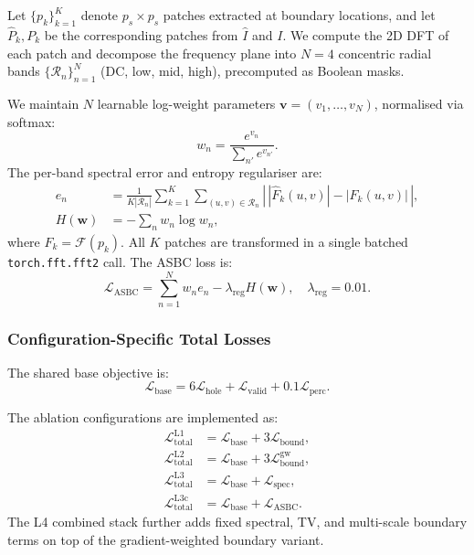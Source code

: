 \documentclass[10pt,conference]{IEEEtran}
\newcommand{\Lhole}{\mathcal{L}_{\mathrm{hole}}}
\newcommand{\Lvalid}{\mathcal{L}_{\mathrm{valid}}}
\newcommand{\Lbound}{\mathcal{L}_{\mathrm{bound}}}
\newcommand{\Lperc}{\mathcal{L}_{\mathrm{perc}}}
\newcommand{\Lspec}{\mathcal{L}_{\mathrm{spec}}}
\newcommand{\LASBC}{\mathcal{L}_{\mathrm{ASBC}}}
\newcommand{\Ltotal}{\mathcal{L}_{\mathrm{total}}}
\newcommand{\Lbase}{\mathcal{L}_{\mathrm{base}}}
\begin{document}
Let $\{p_k\}_{k=1}^{K}$ denote $p_s \times p_s$ patches extracted at
boundary locations, and let $\hat{P}_k, P_k$ be the corresponding patches
from $\hat{I}$ and $I$.  We compute the 2D DFT of each patch and decompose
the frequency plane into $N=4$ concentric radial bands
$\{\mathcal{R}_n\}_{n=1}^{N}$ (DC, low, mid, high), precomputed as
Boolean masks.

We maintain $N$ learnable log-weight parameters
$\mathbf{v} = (v_1,\ldots,v_N)$, normalised via softmax:
\begin{equation}
  w_n = \frac{e^{v_n}}{\sum_{n'} e^{v_{n'}}}.
  \label{eq:softmax_w}
\end{equation}
The per-band spectral error and entropy regulariser are:
\begin{align}
  e_n &= \frac{1}{K|\mathcal{R}_n|}\sum_{k=1}^{K}\sum_{(u,v)\in\mathcal{R}_n}
         \!\!\left|\,|\hat{F}_k(u,v)| - |F_k(u,v)|\,\right|,
  \label{eq:band_error}\\
  H(\mathbf{w}) &= -\sum_n w_n \log w_n,
  \label{eq:entropy}
\end{align}
where $F_k = \mathcal{F}(p_k)$.  All $K$ patches are transformed in a single
batched \texttt{torch.fft.fft2} call.  The ASBC loss is:
\begin{equation}
  \LASBC = \sum_{n=1}^{N} w_n e_n - \lambda_{\mathrm{reg}} H(\mathbf{w}),
  \quad \lambda_{\mathrm{reg}}=0.01.
  \label{eq:asbc}
\end{equation}

\subsubsection{Configuration-Specific Total Losses}
The shared base objective is:
\begin{equation}
  \Lbase = 6\Lhole + \Lvalid + 0.1\Lperc.
  \label{eq:lbase}
\end{equation}

The ablation configurations are implemented as:
\begin{align}
  \Ltotal^{\mathrm{L1}}  &= \Lbase + 3\Lbound, \label{eq:ltotal_l1}\\
  \Ltotal^{\mathrm{L2}}  &= \Lbase + 3\Lbound^{\mathrm{gw}}, \label{eq:ltotal_l2}\\
  \Ltotal^{\mathrm{L3}}  &= \Lbase + \Lspec, \label{eq:ltotal_l3}\\
  \Ltotal^{\mathrm{L3c}} &= \Lbase + \LASBC. \label{eq:ltotal_l3c}
\end{align}
The L4 combined stack further adds fixed spectral, TV, and multi-scale
boundary terms on top of the gradient-weighted boundary variant.
\end{document}
